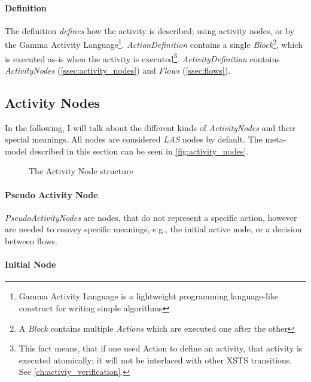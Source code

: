 \paragraph{Definition}\label{par:definition}

The definition \emph{defines} how the activity is described; using activity nodes, or by the Gamma Activity Language\footnote{Gamma Activity Language is a lightweight programming language-like construct for writing simple algorithms}. \emph{ActionDefinition} contains a single \emph{Block}\footnote{A \emph{Block} contains multiple \emph{Actions} which are executed one after the other}, which is executed as-is when the activity is executed\footnote{This fact means, that if one used Action to define an activity, that activity is executed atomically; it will not be interlaced with other XSTS transitions. See \autoref{ch:activiy_verification}.}. \emph{ActivityDefinition} contains \emph{ActivityNodes} (\autoref{ssec:activity_nodes}) and \emph{Flows} (\autoref{ssec:flows}).

\subsection{Activity Nodes}\label{ssec:activity_nodes}

In the following, I will talk about the different kinds of \emph{ActivityNodes} and their special meanings. All nodes are considered \emph{LAS} nodes by default. The meta-model described in this section can be seen in \autoref{fig:activity_nodes}.

\begin{figure}[!ht]
	\centering
	
	\caption{The Activity Node structure}
	\label{fig:activity_nodes}
\end{figure}

\paragraph{Pseudo Activity Node}

\emph{PseudoActivityNodes} are nodes, that do not represent a specific action, however are needed to convey specific meanings, e.g., the initial active node, or a decision between flows.

\paragraph{Initial Node}

